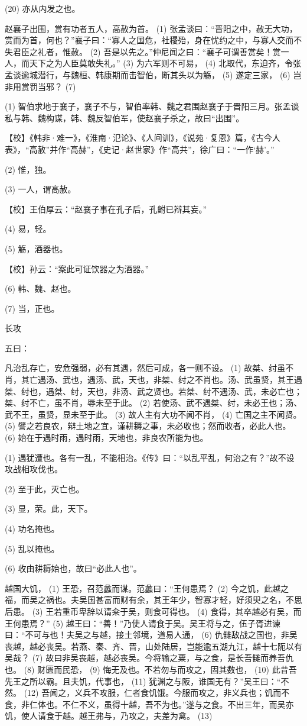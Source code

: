\documentclass[12pt,UTF8]{ctexbook}
\begin{document}
(20) 亦从内发之也。

赵襄子出围，赏有功者五人，高赦为首。 (1) 张孟谈曰：“晋阳之中，赦无大功，赏而为首，何也？”襄子曰：“寡人之国危，社稷殆，身在忧约之中，与寡人交而不失君臣之礼者，惟赦。 (2) 吾是以先之。”仲尼闻之曰：“襄子可谓善赏矣！赏一人，而天下之为人臣莫敢失礼。” (3) 为六军则不可易， (4) 北取代，东迫齐，令张孟谈逾城潜行，与魏桓、韩康期而击智伯，断其头以为觞， (5) 遂定三家， (6) 岂非用赏罚当邪？ (7)

(1) 智伯求地于襄子，襄子不与，智伯率韩、魏之君围赵襄子于晋阳三月。张孟谈私与韩、魏构谋，韩、魏反智伯军，使赵襄子杀之，故曰“出围”。

【校】《韩非·难一》，《淮南·氾论》、《人间训》，《说苑·复恩》篇，《古今人表》，“高赦”并作“高赫”，《史记·赵世家》作“高共”，徐广曰：“一作‘赫’。”

(2) 惟，独。

(3) 一人，谓高赦。

【校】王伯厚云：“赵襄子事在孔子后，孔鲋已辩其妄。”

(4) 易，轻。

(5) 觞，酒器也。

【校】孙云：“案此可证饮器之为酒器。”

(6) 韩、魏、赵也。

(7) 当，正也。





长攻


五曰：

凡治乱存亡，安危强弱，必有其遇，然后可成，各一则不设。 (1) 故桀、纣虽不肖，其亡遇汤、武也，遇汤、武，天也，非桀、纣之不肖也。汤、武虽贤，其王遇桀、纣也，遇桀、纣，天也，非汤、武之贤也。若桀、纣不遇汤、武，未必亡也；桀、纣不亡，虽不肖，辱未至于此。 (2) 若使汤、武不遇桀、纣，未必王也；汤、武不王，虽贤，显未至于此。 (3) 故人主有大功不闻不肖， (4) 亡国之主不闻贤。 (5) 譬之若良农，辩土地之宜，谨耕耨之事，未必收也；然而收者，必此人也。 (6) 始在于遇时雨，遇时雨，天地也，非良农所能为也。

(1) 遇犹遭也。各有一乱，不能相治。《传》曰：“以乱平乱，何治之有？”故不设攻战相攻伐也。

(2) 至于此，灭亡也。

(3) 显，荣。此，天下。

(4) 功名掩也。

(5) 乱以掩也。

(6) 收由耕耨始也，故曰“必此人也”。

越国大饥， (1) 王恐，召范蠡而谋。范蠡曰：“王何患焉？ (2) 今之饥，此越之福，而吴之祸也。夫吴国甚富而财有余，其王年少，智寡才轻，好须臾之名，不思后患。 (3) 王若重币卑辞以请籴于吴，则食可得也。 (4) 食得，其卒越必有吴，而王何患焉？” (5) 越王曰：“善！”乃使人请食于吴。吴王将与之，伍子胥进谏曰：“不可与也！夫吴之与越，接土邻境，道易人通， (6) 仇雠敌战之国也，非吴丧越，越必丧吴。若燕、秦、齐、晋，山处陆居，岂能逾五湖九江，越十七阨以有吴哉？ (7) 故曰非吴丧越，越必丧吴。今将输之粟，与之食，是长吾雠而养吾仇也。 (8) 财匮而民恐， (9) 悔无及也。不若勿与而攻之，固其数也， (10) 此昔吾先王之所以霸。且夫饥，代事也， (11) 犹渊之与阪，谁国无有？”吴王曰：“不然。 (12) 吾闻之，义兵不攻服，仁者食饥饿。今服而攻之，非义兵也；饥而不食，非仁体也。不仁不义，虽得十越，吾不为也。”遂与之食。不出三年，而吴亦饥，使人请食于越。越王弗与，乃攻之，夫差为禽。 (13)
\end{document}
